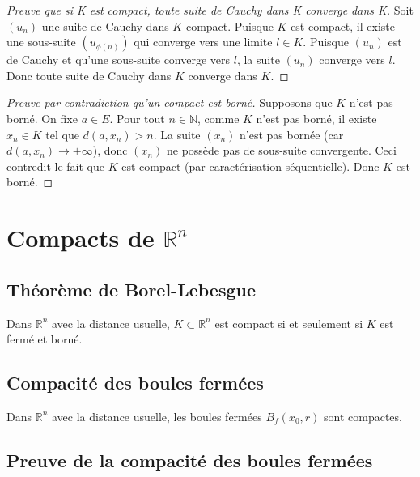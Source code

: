 \documentclass[oneside]{book}
\begin{document}
\begin{proof}[Preuve que si K est compact, toute suite de Cauchy dans K converge dans K]
Soit $(u_n)$ une suite de Cauchy dans $K$ compact. Puisque $K$ est compact, il existe une sous-suite $(u_{\phi(n)})$ qui converge vers une limite $l \in K$. Puisque $(u_n)$ est de Cauchy et qu'une sous-suite converge vers $l$, la suite $(u_n)$ converge vers $l$. Donc toute suite de Cauchy dans $K$ converge dans $K$.
\end{proof}

\begin{proof}[Preuve par contradiction qu'un compact est borné]
Supposons que $K$ n'est pas borné. On fixe $a \in E$. Pour tout $n \in \mathbb{N}$, comme $K$ n'est pas borné, il existe $x_n \in K$ tel que $d(a, x_n) > n$. La suite $(x_n)$ n'est pas bornée (car $d(a, x_n) \to +\infty$), donc $(x_n)$ ne possède pas de sous-suite convergente. Ceci contredit le fait que $K$ est compact (par caractérisation séquentielle). Donc $K$ est borné.
\end{proof}

\section{Compacts de $\mathbb{R}^n$}

\subsection{Théorème de Borel-Lebesgue}

\begin{theorem}
Dans $\mathbb{R}^n$ avec la distance usuelle, $K \subset \mathbb{R}^n$ est compact si et seulement si $K$ est fermé et borné.
\end{theorem}

\subsection{Compacité des boules fermées}

\begin{proposition}
Dans $\mathbb{R}^n$ avec la distance usuelle, les boules fermées $B_f(x_0, r)$ sont compactes.
\end{proposition}

\subsection{Preuve de la compacité des boules fermées}
\end{document}
